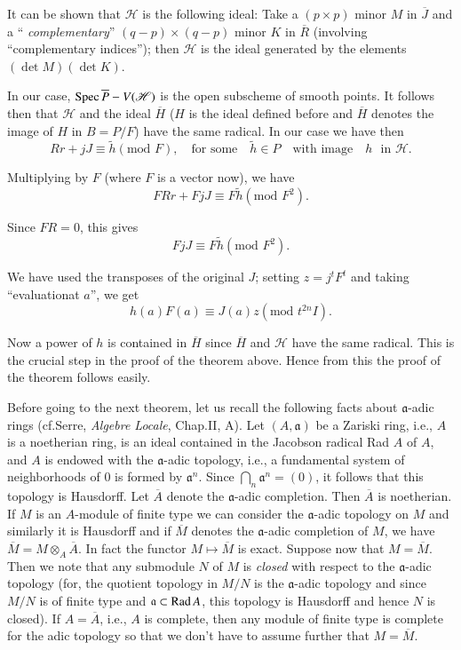 It can be shown that $\mathscr{H}$ is the following ideal: Take a
$(p\times p)$ minor $M$ in $\overline{J}$ and a ``{\em
  complementary}'' $(q-p)\times (q-p)$ minor $K$ in $\overline{R}$
(involving ``complementary indices''); then $\mathscr{H}$ is the ideal
generated by the elements $(\det M)(\det K)$.

In our case, $\operatorname{Spec} \overline{P}-V(\mathscr{H})$ is the open subscheme
of smooth points. It follows then that $\mathscr{H}$ and the ideal
$\overline{H}$ ($H$ is the ideal defined before and $\overline{H}$
denotes the image of $H$ in $B=P/F$) have the same radical. In our
case we have then
$$
Rr+jJ\equiv \widetilde{h}(\text{mod~}F),\quad\text{for some}\quad
\widetilde{h}\in P\quad\text{with image}\quad h\text{~ in~
}\mathscr{H}.
$$

Multiplying by $F$ (where $F$ is a vector now), we have
$$
FRr+FjJ\equiv F\widetilde{h}(\text{mod~}F^{2}).
$$

Since $FR=0$, this gives
$$
FjJ\equiv F\widetilde{h}(\text{mod~}F^{2}).
$$

We have used the transposes of the original $J$; setting
$z=j^{t}F^{t}$ and taking ``evaluation\pageoriginale at $a$'', we get
$$
h(a)F(a)\equiv J(a)z(\text{mod~}t^{2n}I).
$$

Now a power of $h$ is contained in $\overline{H}$ since $\overline{H}$
and $\mathscr{H}$ have the same radical. This is the crucial step in
the proof of the theorem above. Hence from this the proof of the
theorem follows easily.

Before going to the next theorem, let us recall the following facts
about $\mathfrak{a}$-adic rings (cf.\@ Serre, {\em Algebre Locale},
Chap.\@ II, A). Let $(A,\mathfrak{a})$ be a Zariski ring, i.e., $A$ is
a noetherian ring, is an ideal contained in the Jacobson radical Rad
$A$ of $A$, and $A$ is endowed with the $\mathfrak{a}$-adic topology,
i.e., a fundamental system of neighborhoods of $0$ is formed by
$\mathfrak{a}^{n}$. Since $\bigcap\limits_{n}\mathfrak{a}^{n}=(0)$, it
follows that this topology is Hausdorff. Let $\overline{A}$ denote the
$\mathfrak{a}$-adic completion. Then $\overline{A}$ is noetherian. If
$M$ is an $A$-module of finite type we can consider the
$\mathfrak{a}$-adic topology on $M$ and similarly it is Hausdorff and
if $\overline{M}$ denotes the $\mathfrak{a}$-adic completion of $M$,
we have $\overline{M}=M\otimes_{A}\overline{A}$. In fact the functor
$M\mapsto \overline{M}$ is exact. Suppose now that
$M=\overline{M}$. Then we note that any submodule $N$ of $M$ is {\em
  closed} with respect to the $\mathfrak{a}$-adic topology (for, the
quotient topology in $M/N$ is the $\mathfrak{a}$-adic topology and
since $M/N$ is of finite type and $\mathfrak{a}\subset \operatorname{Rad} A$, this
topology is Hausdorff and hence $N$ is closed). If $A=\overline{A}$,
i.e., $A$ is complete, then any module of finite type is complete for
the adic topology so that we don't have to assume further that
$M=\overline{M}$. 

